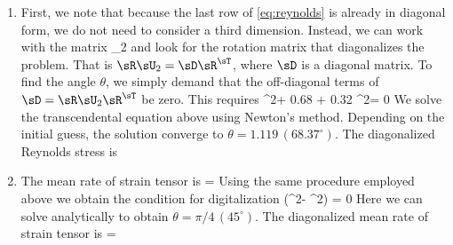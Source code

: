 \documentclass[11pt]{article}
\begin{document}
\begin{enumerate}[label=(\alph*)]
    \item First, we note that because the last row of \eqref{eq:reynolds} is already in diagonal form, we do not need to consider a third dimension. Instead, we can work with the matrix
        \beq
      \sD_2         \left[ \begin{matrix}
        1.08 & -0.32 \\
        -0.32 & 0.40 
\end{matrix} \right]\com
        \eeq
    and look for the rotation matrix
    \beq
    \sR {}
        \left[ \begin{matrix}
        \cos \theta & \sin \theta \\
        -\sin \theta & \cos \theta 
\end{matrix} \right]
    \eeq
    that diagonalizes the problem. That is $\sR \sU_2 = \sD \sR^\sT$, where $\sD$ is a diagonal matrix. To find the angle $\theta$, we simply demand that the off-diagonal terms of $\sD = \sR \sU_2 \sR^\sT$ be zero. This requires
     \cos^2\theta + 0.68 \cos\theta\sin\theta + 0.32 \sin^2\theta = 0\per
    \eeq
    We solve the transcendental equation above using Newton's method. Depending on the initial guess, the solution converge to $\theta = 1.119  \,(68.37^\circ)$. The diagonalized Reynolds stress is
    \beq
    \left[ \begin{matrix}
        0.23 & 0 & 0. \\
        0 & 1.21 & 0 \\
        0 & 0 & 0.52
\end{matrix} \right]\per            
    \eeq

    \item The mean rate of strain tensor is
        \beq
        \sS =  \left[ \begin{matrix}
        0 & \p U_1/\p x_2 & 0. \\
         \p U_1/\p x_2 & 0 & 0 \\
        0 & 0 & 0
\end{matrix} \right]
        \eeq
        Using the same procedure employed above we obtain the condition for digitalization
        \beq
            \left(\cos^2\theta - \sin^2\theta \right) = 0\per
        \eeq
        Here we can solve analytically to obtain $\theta= \pi/4 \, (45^\circ)$. The diagonalized mean rate of strain tensor is
        \beq
        \sS =  \left[ \begin{matrix}
        \p U_1/\p x_2 & 0 & 0. \\
         0 & -\p U_1/\p x_2 & 0 \\
            0 & 0 & 0 
\end{matrix} \right] \per
        \eeq



\end{enumerate}
\end{document}
